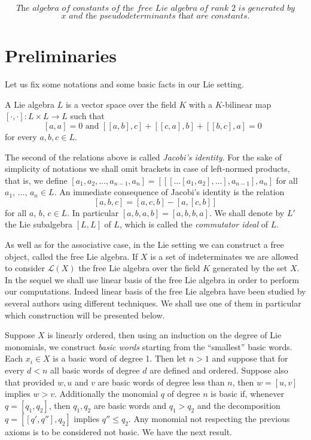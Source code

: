 \documentclass{cimart}
\begin{document}
\[\textit{The algebra of constants of the free Lie algebra of rank 2 is generated by}\]\[\textit{$x$ and the pseudodeterminants that are constants.} \]


\section{Preliminaries}

Let us fix some notations and some basic facts in our Lie setting.  

\begin{definition}A Lie algebra $L$ is a vector space over the field $K$ with a $K$-bilinear map $[\cdot,\cdot]:L \times L \rightarrow L$ such that \[\text{$[a,a]=0$ and $[[a,b],c]+[[c,a],b]+[[b,c],a]=0$ }\] for every $a,b,c\in L$.
\end{definition}

The second of the relations above is called \textit{Jacobi's identity}. For the sake of simplicity of notations we shall omit brackets in case of left-normed products, that is, we define 
$[a_1, a_2, \ldots, a_{n-1}, a_n] = [[[\ldots [a_1, a_2], \ldots], a_{n-1}], a_n]$
for all $a_1$, $\ldots$, $a_n \in  L$. An immediate consequence of Jacobi's identity is the relation
\begin{equation}\label{identidade_importante}
[a, b, c] = [a, c, b] - [a, [c, b]]
\end{equation}
for all $a$, $b$, $c \in L$. In particular $[a, b, a, b] = [a, b, b, a]$. We shall denote by $L'$ the Lie subalgebra $[L,L]$ of $L$, which is called the \textit{commutator ideal} of $L$.

As well as for the associative case, in the Lie setting we can construct a free object, called the free Lie algebra. If $X$ is a set of indeterminates we are allowed to consider $\mathcal{L}(X)$ the free Lie algebra over the field $K$ generated by the set $X$. In the sequel we shall use linear basis of the free Lie algebra in order to perform our computations. Indeed linear basis of the free Lie algebra have been studied by several authors using different techniques. We shall use one of them in particular which construction will be presented below.

Suppose $X$ is linearly ordered, then using an induction on the degree of Lie monomials, we construct \textit{basic words} starting from the ``smallest'' basic words. Each $x_i\in X$ is a basic word of degree 1. Then let $n>1$ and suppose that for every $d<n$ all basic words of degree $d$ are defined and ordered. Suppose also that provided $w,u$ and $v$ are basic words of degree less than $n$, then $w=[u,v]$ implies $w>v$. Additionally the monomial $q$ of degree $n$ is basic if, whenever $q=[q_1,q_2]$, then $q_1,q_2$ are basic words and $q_1>q_2$ and the decomposition $q=[[q',q''],q_2]$ implies $q''\leq q_2$. Any monomial not respecting the previous axioms is to be considered not basic. We have the next result. 
\end{document}
